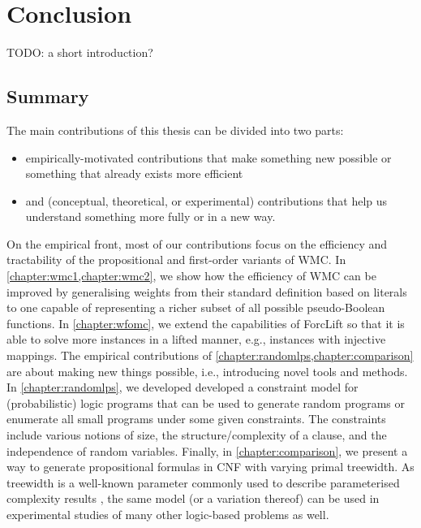 \chapter{Conclusion} \label{chapter:conclusion} %


TODO: a short introduction?

\section{Summary}

The main contributions of this thesis can be divided into two parts:
\begin{itemize}
\item empirically-motivated contributions that make something new possible or something that already exists more efficient
\item and (conceptual, theoretical, or experimental) contributions that help us understand something more fully or in a new way.
\end{itemize}


On the empirical front, most of our contributions focus on the efficiency and tractability of the propositional and first-order variants of WMC. In \cref{chapter:wmc1,chapter:wmc2}, we show how the efficiency of WMC can be improved by generalising weights from their standard definition based on literals to one capable of representing a richer subset of all possible pseudo-Boolean functions. In \cref{chapter:wfomc}, we extend the capabilities of ForcLift \citep{DBLP:conf/ijcai/BroeckTMDR11} so that it is able to solve more instances in a lifted manner, e.g., instances with injective mappings. The empirical contributions of \cref{chapter:randomlps,chapter:comparison} are about making new things possible, i.e., introducing novel tools and methods. In \cref{chapter:randomlps}, we developed developed a constraint model for (probabilistic) logic programs that can be used to generate random programs or enumerate all small programs under some given constraints. The constraints include various notions of size, the structure/complexity of a clause, and the independence of random variables. Finally, in \cref{chapter:comparison}, we present a way to generate propositional formulas in CNF with varying primal treewidth. As treewidth is a well-known parameter commonly used to describe parameterised complexity results \citep{DBLP:series/txcs/DowneyF13}, the same model (or a variation thereof) can be used in experimental studies of many other logic-based problems as well.

